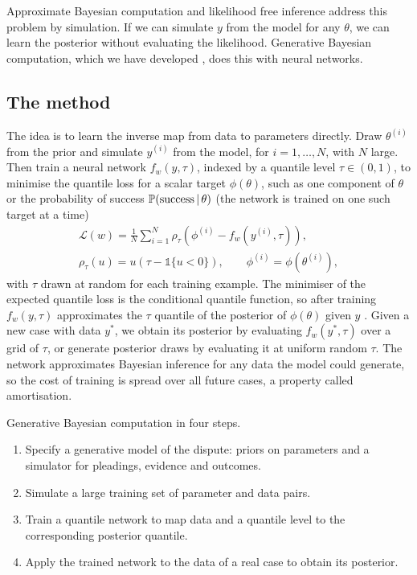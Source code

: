 Approximate Bayesian computation and likelihood free inference address this problem by simulation. If we can simulate $y$ from the model for any $\theta$, we can learn the posterior without evaluating the likelihood. Generative Bayesian computation, which we have developed \citep{polson_sokolov_gbc}, does this with neural networks.

\subsection{The method}

The idea is to learn the inverse map from data to parameters directly. Draw $\theta^{(i)}$ from the prior and simulate $y^{(i)}$ from the model, for $i = 1,\ldots, N$, with $N$ large. Then train a neural network $f_w(y, \tau)$, indexed by a quantile level $\tau \in (0,1)$, to minimise the quantile loss for a scalar target $\phi(\theta)$, such as one component of $\theta$ or the probability of success $\mathbb{P}(\text{success}\,\vert\,\theta)$ (the network is trained on one such target at a time)
\begin{equation}
\begin{gathered}
\mathcal{L}(w) = \frac{1}{N}\sum_{i=1}^N \rho_\tau\left(\phi^{(i)} - f_w(y^{(i)},\tau)\right),\\
\rho_\tau(u) = u(\tau - \mathbb{1}\{u < 0\}), \qquad \phi^{(i)} = \phi(\theta^{(i)}),
\end{gathered}
\label{eq:quantileloss}
\end{equation}
with $\tau$ drawn at random for each training example. The minimiser of the expected quantile loss is the conditional quantile function, so after training $f_w(y,\tau)$ approximates the $\tau$ quantile of the posterior of $\phi(\theta)$ given $y$ \citep{polson_sokolov_gbc}. Given a new case with data $y^\ast$, we obtain its posterior by evaluating $f_w(y^\ast, \tau)$ over a grid of $\tau$, or generate posterior draws by evaluating it at uniform random $\tau$. The network approximates Bayesian inference for any data the model could generate, so the cost of training is spread over all future cases, a property called amortisation.

\begin{keybox}
Generative Bayesian computation in four steps.
\begin{enumerate}[label=\arabic*.]
\item Specify a generative model of the dispute: priors on parameters and a simulator for pleadings, evidence and outcomes.
\item Simulate a large training set of parameter and data pairs.
\item Train a quantile network to map data and a quantile level to the corresponding posterior quantile.
\item Apply the trained network to the data of a real case to obtain its posterior.
\end{enumerate}
\end{keybox}

